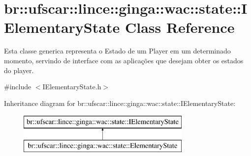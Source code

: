 \hypertarget{classbr_1_1ufscar_1_1lince_1_1ginga_1_1wac_1_1state_1_1IElementaryState}{
\section{br::ufscar::lince::ginga::wac::state::IElementaryState Class Reference}
\label{classbr_1_1ufscar_1_1lince_1_1ginga_1_1wac_1_1state_1_1IElementaryState}
}


Esta classe generica representa o Estado de um Player em um determinado momento, servindo de interface com as aplicações que desejam obter os estados do player.  




{\ttfamily \#include $<$IElementaryState.h$>$}

Inheritance diagram for br::ufscar::lince::ginga::wac::state::IElementaryState:\begin{figure}[H]
\begin{center}
\leavevmode
\includegraphics[height=2cm]{classbr_1_1ufscar_1_1lince_1_1ginga_1_1wac_1_1state_1_1IElementaryState}
\end{center}
\end{figure}
